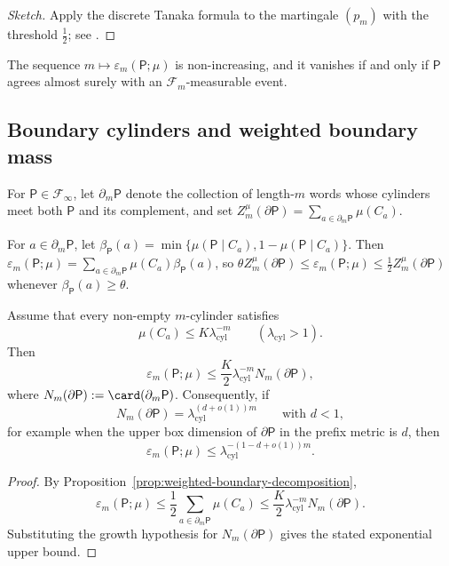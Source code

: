 \begin{proof}[Sketch]
Apply the discrete Tanaka formula to the martingale \((p_m)\) with the
threshold \(\tfrac12\); see \citet[Section~IV.4]{WaltersErgodicTheory}.
\end{proof}

\begin{corollary}\label{cor:clarity-monotone}
The sequence \(m\mapsto \varepsilon_m(\mathsf{P};\mu)\) is
non-increasing, and it vanishes if and only if \(\mathsf{P}\) agrees
almost surely with an \(\mathcal{F}_m\)-measurable event.
\end{corollary}

\subsection{Boundary cylinders and weighted boundary mass}

For \(\mathsf{P}\in\mathcal{F}_\infty\), let
\(\partial_m\mathsf{P}\) denote the collection of length-\(m\) words
whose cylinders meet both \(\mathsf{P}\) and its complement, and set
\(Z_m^\mu(\partial\mathsf{P})=
\sum_{a\in\partial_m\mathsf{P}}\mu(C_a)\).

\begin{proposition}
\label{prop:weighted-boundary-decomposition}
For \(a\in\partial_m\mathsf{P}\), let
\(\beta_{\mathsf{P}}(a)=\min\{\mu(\mathsf{P}\mid C_a),
1-\mu(\mathsf{P}\mid C_a)\}\).  Then
\(\varepsilon_m(\mathsf{P};\mu)
 = \sum_{a\in\partial_m\mathsf{P}} \mu(C_a)\beta_{\mathsf{P}}(a)\),
so \(\theta Z_m^\mu(\partial\mathsf{P}) \leq
\varepsilon_m(\mathsf{P};\mu) \leq \tfrac12 Z_m^\mu(\partial\mathsf{P})\)
whenever \(\beta_{\mathsf{P}}(a)\geq \theta\).
\end{proposition}

\begin{theorem}\label{thm:clarity-boundary-dimension}
Assume that every non-empty \(m\)-cylinder satisfies
\[
  \mu(C_a)\leq K\lambda_{\mathrm{cyl}}^{-m}
  \qquad
  (\lambda_{\mathrm{cyl}}>1).
\]
Then
\[
  \varepsilon_m(\mathsf{P};\mu)
  \leq
  \frac{K}{2}\lambda_{\mathrm{cyl}}^{-m}N_m(\partial\mathsf{P}),
\]
where \(N_m(\partial\mathsf P):=\card(\partial_m\mathsf P)\).
Consequently, if
\[
  N_m(\partial\mathsf P)
  = \lambda_{\mathrm{cyl}}^{(d+o(1))m}
  \qquad\text{with } d<1,
\]
for example when the upper box dimension of \(\partial\mathsf P\) in the
prefix metric is \(d\), then
\[
  \varepsilon_m(\mathsf P;\mu)
  \leq
  \lambda_{\mathrm{cyl}}^{-(1-d+o(1))m}.
\]
\end{theorem}

\begin{proof}
By Proposition~\ref{prop:weighted-boundary-decomposition},
\[
  \varepsilon_m(\mathsf P;\mu)
  \leq
  \frac12\sum_{a\in\partial_m\mathsf P}\mu(C_a)
  \leq
  \frac{K}{2}\lambda_{\mathrm{cyl}}^{-m}N_m(\partial\mathsf P).
\]
Substituting the growth hypothesis for \(N_m(\partial\mathsf P)\) gives
the stated exponential upper bound.
\end{proof}
